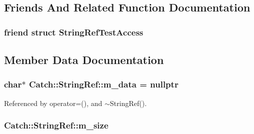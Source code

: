 \subsection{Friends And Related Function Documentation}
\hypertarget{class_catch_1_1_string_ref_a420e64e1652de1b0d427775781b018f5}{
\subsubsection[{String\-Ref\-Test\-Access}]{\setlength{\rightskip}{0pt plus 5cm}friend struct String\-Ref\-Test\-Access\hspace{0.3cm}{\ttfamily [friend]}}}\label{class_catch_1_1_string_ref_a420e64e1652de1b0d427775781b018f5}


\subsection{Member Data Documentation}
\hypertarget{class_catch_1_1_string_ref_ae671eabbedd386aeb334d3da1a904ba5}{
\subsubsection[{m\-\_\-data}]{\setlength{\rightskip}{0pt plus 5cm}char$\ast$ Catch\-::\-String\-Ref\-::m\-\_\-data = nullptr\hspace{0.3cm}{\ttfamily [private]}}}\label{class_catch_1_1_string_ref_ae671eabbedd386aeb334d3da1a904ba5}


Referenced by operator=(), and $\sim$\-String\-Ref().

\hypertarget{class_catch_1_1_string_ref_a91ee253f5b7e43303352186139845753}{
\subsubsection[{m\-\_\-size}]{ Catch\-::\-String\-Ref\-::m\-\_\-size\hspace{0.3cm}{\ttfamily [private]}}}\label{class_catch_1_1_string_ref_a91ee253f5b7e43303352186139845753}



